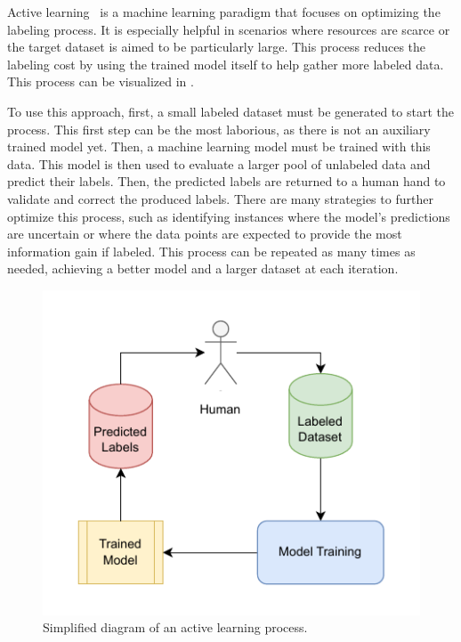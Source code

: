 Active learning~\cite{settles_active_2009} is a machine learning paradigm that focuses on optimizing the labeling process. It is especially helpful in scenarios where resources are scarce or the target dataset is aimed to be particularly large. This process reduces the labeling cost by using the trained model itself to help gather more labeled data. This process can be visualized in .

To use this approach, first, a small labeled dataset must be generated to start the process. This first step can be the most laborious, as there is not an auxiliary trained model yet. Then, a machine learning model must be trained with this data. This model is then used to evaluate a larger pool of unlabeled data and predict their labels. Then, the predicted labels are returned to a human hand to validate and correct the produced labels. There are many strategies to further optimize this process, such as identifying instances where the model's predictions are uncertain or where the data points are expected to provide the most information gain if labeled. This process can be repeated as many times as needed, achieving a better model and a larger dataset at each iteration.

\begin{figure}[htbp]
\centering
\includegraphics[width=.6\linewidth]{images/active_learning.drawio.pdf}
\caption{Simplified diagram of an active learning process.}
\label{fig:activelearning}
\end{figure}